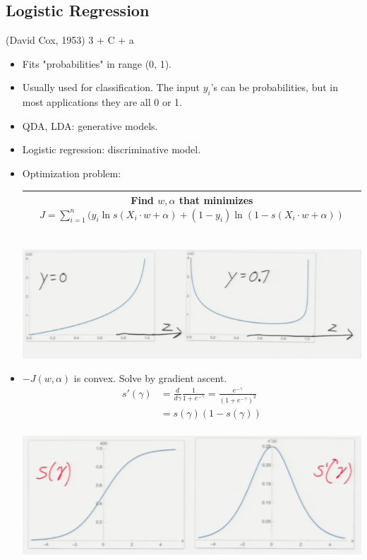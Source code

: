 \documentclass[10pt]{article}
\begin{document}
	\subsection*{Logistic Regression} (David Cox, 1953) 3 + C + a
		\begin{itemize}
			\item Fits "probabilities" in range (0, 1).
			\item Usually used for classification. The input $y_{i}$'s can be probabilities, but in most applications they are all 0 or 1.
			\item QDA, LDA: generative models.
			\item Logistic regression: discriminative model.
			\item Optimization problem:
				\begin{center}
					\begin{tabular}{|c|}
					\hline
						Find $w, \alpha$ that minimizes $J = \sum_{i=1}^{n}(y_{i} \ln s(X_{i} \cdot w + \alpha) + (1-y_{i}) \ln (1 - s(X_{i} \cdot w + \alpha))$\\
						\hline
					\end{tabular}\\
					[1em]
					\includegraphics[scale=0.5]{images/logistics}
				\end{center}
			\item $-J(w, \alpha)$ is convex. Solve by gradient ascent.
			\begin{align*}
				s'(\gamma) &= \frac{d}{d\gamma} \frac{1}{1 + e^{-\gamma}} = \frac{e^{-\gamma}}{(1 + e^{-\gamma})^{2}}\\
				&= s(\gamma)(1 - s(\gamma))\\
			\end{align*}
			\begin{center}
				\includegraphics[scale=0.5]{images/gradients}

\end{center}
\end{itemize}
\end{document}

